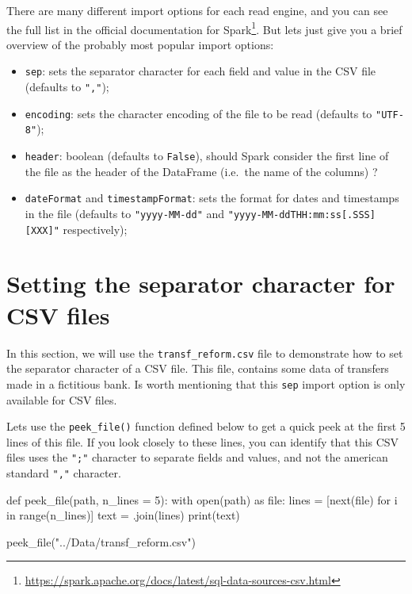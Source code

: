 \documentclass[
  11pt,
  letterpaper,
  DIV=11,
  numbers=noendperiod]{scrreprt}
\newenvironment{Shaded}{\begin{snugshade}}{\end{snugshade}}
\newcommand{\BuiltInTok}[1]{\textcolor[rgb]{0.00,0.23,0.31}{#1}}
\newcommand{\ControlFlowTok}[1]{\textcolor[rgb]{0.00,0.23,0.31}{#1}}
\newcommand{\DecValTok}[1]{\textcolor[rgb]{0.68,0.00,0.00}{#1}}
\newcommand{\ImportTok}[1]{\textcolor[rgb]{0.00,0.46,0.62}{#1}}
\newcommand{\KeywordTok}[1]{\textcolor[rgb]{0.00,0.23,0.31}{#1}}
\newcommand{\NormalTok}[1]{\textcolor[rgb]{0.00,0.23,0.31}{#1}}
\newcommand{\OperatorTok}[1]{\textcolor[rgb]{0.37,0.37,0.37}{#1}}
\newcommand{\StringTok}[1]{\textcolor[rgb]{0.13,0.47,0.30}{#1}}
\providecommand{\tightlist}{%
  \setlength{\itemsep}{0pt}\setlength{\parskip}{0pt}}\usepackage{longtable,booktabs,array}
\begin{document}
There are many different import options for each read engine, and you
can see the full list in the official documentation for
Spark\footnote{\url{https://spark.apache.org/docs/latest/sql-data-sources-csv.html}}.
But lets just give you a brief overview of the probably most popular
import options:

\begin{itemize}
\tightlist
\item
  \texttt{sep}: sets the separator character for each field and value in
  the CSV file (defaults to \texttt{","});
\item
  \texttt{encoding}: sets the character encoding of the file to be read
  (defaults to \texttt{"UTF-8"});
\item
  \texttt{header}: boolean (defaults to \texttt{False}), should Spark
  consider the first line of the file as the header of the DataFrame
  (i.e.~the name of the columns) ?
\item
  \texttt{dateFormat} and \texttt{timestampFormat}: sets the format for
  dates and timestamps in the file (defaults to \texttt{"yyyy-MM-dd"}
  and
  \texttt{"yyyy-MM-dd\textquotesingle{}T\textquotesingle{}HH:mm:ss{[}.SSS{]}{[}XXX{]}"}
  respectively);
\end{itemize}

\section{Setting the separator character for CSV
files}\label{setting-the-separator-character-for-csv-files}

In this section, we will use the \texttt{transf\_reform.csv} file to
demonstrate how to set the separator character of a CSV file. This file,
contains some data of transfers made in a fictitious bank. Is worth
mentioning that this \texttt{sep} import option is only available for
CSV files.

Lets use the \texttt{peek\_file()} function defined below to get a quick
peek at the first 5 lines of this file. If you look closely to these
lines, you can identify that this CSV files uses the \texttt{";"}
character to separate fields and values, and not the american standard
\texttt{","} character.

\begin{Shaded}
\begin{Highlighting}[]
\KeywordTok{def}\NormalTok{ peek\_file(path, n\_lines }\OperatorTok{=} \DecValTok{5}\NormalTok{):}
  \ControlFlowTok{with} \BuiltInTok{open}\NormalTok{(path) }\ImportTok{as} \BuiltInTok{file}\NormalTok{:}
\NormalTok{    lines }\OperatorTok{=}\NormalTok{ [}\BuiltInTok{next}\NormalTok{(}\BuiltInTok{file}\NormalTok{) }\ControlFlowTok{for}\NormalTok{ i }\KeywordTok{in} \BuiltInTok{range}\NormalTok{(n\_lines)]}
\NormalTok{  text }\OperatorTok{=} \StringTok{\textquotesingle{}\textquotesingle{}}\NormalTok{.join(lines)}
  \BuiltInTok{print}\NormalTok{(text)}
  
\NormalTok{peek\_file(}\StringTok{"../Data/transf\_reform.csv"}\NormalTok{)}
\end{Highlighting}
\end{Shaded}
\end{document}
